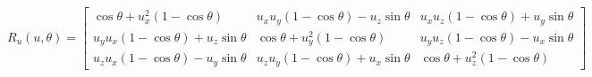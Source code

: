   \begin{equation}
    R_{u}\left( u, \theta \right) =
    \begin{bmatrix}
      \cos\theta + u_{x}^{2}\left( 1 - \cos\theta \right) & u_{x} u_{y} \left( 1 - \cos\theta \right) - u_{z} \sin\theta & u_{x} u_{z} \left( 1 - \cos\theta \right) + u_{y} \sin\theta \\
      u_{y} u_{x} \left( 1 - \cos\theta \right) + u_{z} \sin\theta & \cos\theta + u_{y}^{2}\left( 1 - \cos\theta \right) & u_{y} u_{z} \left( 1 - \cos\theta \right) - u_{x} \sin\theta \\
      u_{z} u_{x} \left( 1 - \cos\theta \right) - u_{y} \sin\theta & u_{z} u_{y} \left( 1 - \cos\theta \right) + u_{x} \sin\theta & \cos\theta + u_{z}^{2}\left( 1 - \cos\theta \right)
    \end{bmatrix}
  \end{equation}
